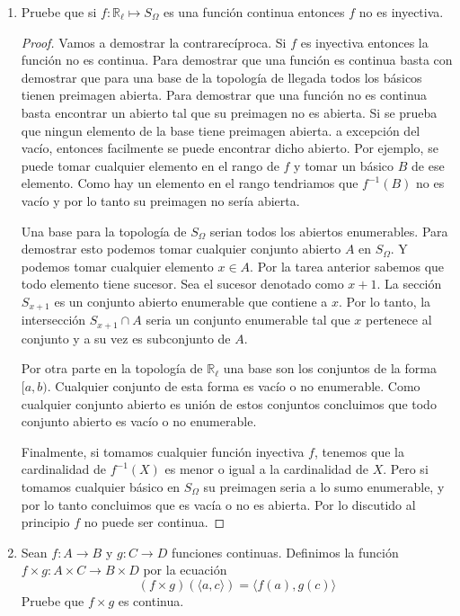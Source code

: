 \documentclass[letter,twoside,11pt]{article}
\begin{document}
\begin{enumerate}
\item Pruebe que si $f: \mathbb{R_{\ell}} \mapsto S_{\Omega}$ es una funci\'on continua entonces $f$ no es inyectiva. 
\begin{proof}
Vamos a demostrar la contrarec\'iproca. Si $f$ es inyectiva entonces la funci\'on no es continua. Para demostrar que una funci\'on es continua basta con demostrar que para una base de la topolog\'ia de llegada todos los b\'asicos tienen preimagen abierta. Para demostrar que una función no es continua basta encontrar un abierto tal que su preimagen no es abierta. Si se prueba que ningun elemento de la base tiene preimagen abierta. a excepción del vac\'io, entonces facilmente se puede encontrar dicho abierto. Por ejemplo, se puede tomar cualquier elemento en el rango de $f$ y tomar un básico $B$ de ese elemento. Como hay un elemento en el rango tendriamos que $f^{-1}(B)$ no es vac\'io y por lo tanto su preimagen no sería abierta.

Una base para la topolog\'ia de $S_{\Omega}$ serian todos los abiertos enumerables. Para demostrar esto podemos tomar cualquier conjunto abierto $A$ en $S_{\Omega}$. Y podemos tomar cualquier elemento $x \in A$. Por la tarea anterior sabemos que todo elemento tiene sucesor. Sea el sucesor denotado como $x+1$. La secci\'on $S_{x+1}$ es un conjunto abierto enumerable que contiene a $x$. Por lo tanto, la intersecci\'on $S_{x+1} \cap A$ seria un conjunto enumerable tal que $x$ pertenece al conjunto y a su vez es subconjunto de $A$.

Por otra parte en la topolog\'ia de $\mathbb{R}_{\ell}$ una base son los conjuntos de la forma $[a,b)$. Cualquier conjunto de esta forma es vacío o no enumerable. Como cualquier conjunto abierto es uni\'on de estos conjuntos concluimos que todo conjunto abierto es vacío o no enumerable.

Finalmente, si tomamos cualquier funci\'on inyectiva $f$, tenemos que la cardinalidad de $f^{-1}(X)$ es menor o igual a la cardinalidad de $X$. Pero si tomamos cualquier b\'asico en $S_{\Omega}$ su preimagen seria a lo sumo enumerable, y por lo tanto concluimos que es vac\'ia o no es abierta. Por lo discutido al principio $f$ no puede ser continua.
\end{proof}

\item Sean $f:A \to B$ y $g: C \to D$ funciones continuas. Definimos la funci\'on $ f \times g: A \times C \to B \times D $ por la ecuaci\'on
\begin{equation}
(f \times g)(\langle a,c \rangle)=\langle f(a),g(c) \rangle \nonumber
\end{equation}
Pruebe que $f \times g$ es continua.


\end{enumerate}
\end{document}
